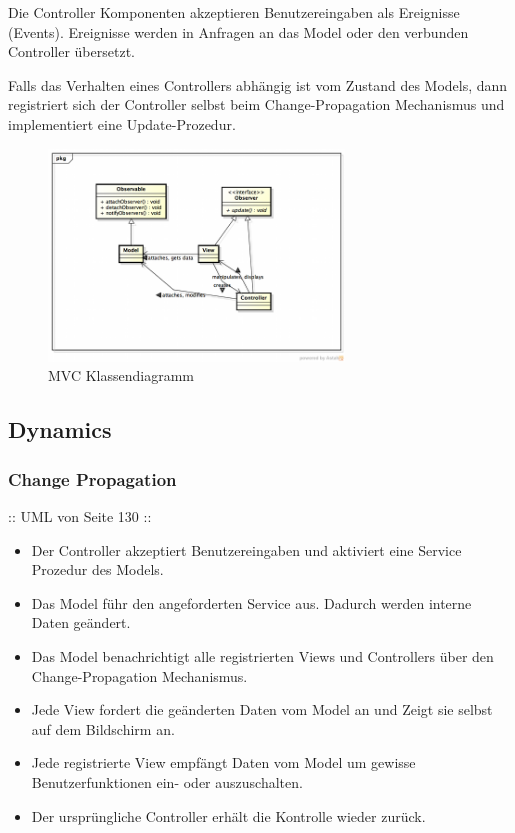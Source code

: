 Die Controller Komponenten akzeptieren Benutzereingaben als Ereignisse (Events). Ereignisse werden in Anfragen an das Model oder den verbunden Controller übersetzt.

Falls das Verhalten eines Controllers abhängig ist vom Zustand des Models, dann registriert sich der Controller selbst beim Change-Propagation Mechanismus und implementiert eine Update-Prozedur.

\begin{figure}[H]
	\centering
	\includegraphics[width=0.7\textwidth]{content/posa1/images/mvc-classes.png}
	\caption{MVC Klassendiagramm}
\end{figure}


\subsection*{Dynamics}


\subsubsection*{Change Propagation}


:: UML von Seite 130 ::

\begin{itemize}
	\item Der Controller akzeptiert Benutzereingaben und aktiviert eine Service Prozedur des Models.
	\item Das Model führ den angeforderten Service aus. Dadurch werden interne Daten geändert.
	\item Das Model benachrichtigt alle registrierten Views und Controllers über den Change-Propagation Mechanismus.
	\item Jede View fordert die geänderten Daten vom Model an und Zeigt sie selbst auf dem Bildschirm an.
	\item Jede registrierte View empfängt Daten vom Model um gewisse Benutzerfunktionen ein- oder auszuschalten.
	\item Der ursprüngliche Controller erhält die Kontrolle wieder zurück.
\end{itemize}

